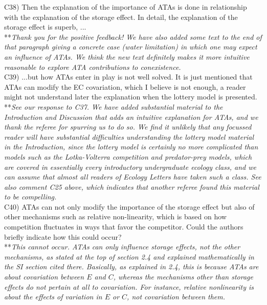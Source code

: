 \documentclass[letterpaper,11pt]{article}
\begin{document}
\noindent C38) Then the explanation of the importance of ATAs is done in relationship with the explanation of the storage effect. In detail, the explanation of the storage effect is superb, ... \\

\noindent ***\emph{Thank you for the positive feedback! We have also added some text to the end of that paragraph giving a 
concrete case (water limitation) in which one may expect an influence of ATAs. We think the new text definitely
makes it more intuitive reasonable to explore ATA contributions to conexistence.} \\

\noindent C39) ...but how ATAs enter in play is not well solved. It is just mentioned that ATAs can modify the EC covariation, which I believe is not enough, a reader might not understand later the explanation when the lottery model is presented. \\

\noindent ***\emph{See our response to C37. We have added substantial material to the Introduction and Discussion that adds an
intuitive explanation for ATAs, and we thank the referee for spurring us to do so. 
We find it unlikely that any focussed reader will have substantial difficulties understanding the lottery model
material in the Introduction, since the lottery model is certainly no more complicated than models such as the Lotka-Volterra 
competition and predator-prey models, which are covered in essentially every introductory undergraduate ecology class, and we can assume
that almost all readers of Ecology Letters have taken such a class. See also comment C25 above, which indicates that another
referee found this material to be compelling.} \\

\noindent C40) ATAs can not only modify the importance of the storage effect but also of other mechanisms such as relative non-linearity, which is based on how competition fluctuates in ways that favor the competitor. Could the authors briefly indicate how this could occur? \\

\noindent ***\emph{This cannot occur. ATAs can only influence storage effects, not the other mechanisms, as stated at
the top of section 2.4 and explained mathematically in the SI section cited there. Basically, as explained in 2.4, 
this is because ATAs are about covariation between $E$ and $C$, whereas the mechanisms other than storage effects
do not pertain at all to covariation. For instance, relative nonlinearity is about the effects of variation 
in $E$ or $C$, not covariation between them.} \\
\end{document}
